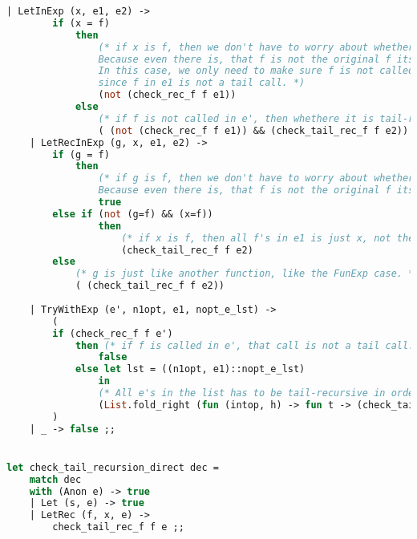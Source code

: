 \begin{lstlisting}[language=Caml, caption=checktailRec.ml]
    | LetInExp (x, e1, e2) ->
        if (x = f) 
            then 
                (* if x is f, then we don't have to worry about whether there is f in e2. 
                Because even there is, that f is not the original f itself. 
                In this case, we only need to make sure f is not called in e1
                since f in e1 is not a tail call. *)
                (not (check_rec_f f e1))
            else 
                (* if f is not called in e', then whethere it is tail-recursive is determined by e2. *)
                ( (not (check_rec_f f e1)) && (check_tail_rec_f f e2))
    | LetRecInExp (g, x, e1, e2) ->
        if (g = f) 
            then 
                (* if g is f, then we don't have to worry about whether there is f in e2. 
                Because even there is, that f is not the original f itself.  *)
                true 
        else if (not (g=f) && (x=f)) 
                then 
                    (* if x is f, then all f's in e1 is just x, not the original f. *)
                    (check_tail_rec_f f e2)
        else 
            (* g is just like another function, like the FunExp case. *)
            ( (check_tail_rec_f f e2))
    
    | TryWithExp (e', n1opt, e1, nopt_e_lst) ->
        (
        if (check_rec_f f e')
            then (* if f is called in e', that call is not a tail call. So it is not tail-recursive. *)
                false
            else let lst = ((n1opt, e1)::nopt_e_lst)
                in
                (* All e's in the list has to be tail-recursive in order to make TryWith to be tail-recursive. *)
                (List.fold_right (fun (intop, h) -> fun t -> (check_tail_rec_f f h) && t) lst true) 
        )
    | _ -> false ;;


let check_tail_recursion_direct dec =
    match dec
    with (Anon e) -> true
    | Let (s, e) -> true
    | LetRec (f, x, e) ->
        check_tail_rec_f f e ;;
\end{lstlisting}